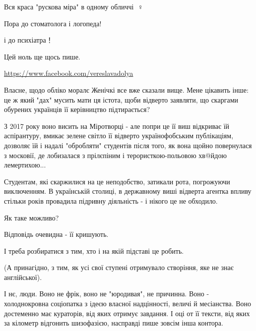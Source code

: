 \begin{itemize}
Вся краса "рускова міра" в одному обличчі 🤦♀️


Пора до стоматолога і логопеда!

\begin{itemize}

і до психіатра！
\end{itemize}


Цей ноль ще щось пише.

\url{https://www.facebook.com/vereslavadolya}\par

Власне, щодо обліко моралє Женічкі все вже сказали вище. Мене цікавить інше: це
ж який "дах" мусить мати ця істота, щоби відверто заявляти, що скаргами
обурених українців її керівництво підтирається? 

З 2017 року воно висить на Міротворці - але попри це її виш відкриває їй
аспірантуру, вмикає зелене світло її відверто українофобським публікаціям,
дозволяє їй і надалі "обробляти" студентів після того, як вона щойно
повернулася з московії, де лобизалася з прілєпіним і терористкою-польовою
хв@йдою лемертихою... 

Студентам, які скаржилися на це неподобство, затикали рота, погрожуючи
виключенням. В українській столиці, в державному виші відверта агентка впливу
стільки років провадила підривну діяльність - і нікого це не обходило.

Як таке можливо?

Відповідь очевидна - її кришують.

І треба розбиратися з тим, хто і на якій підставі це робить.

(А принагідно, з тим, як усі свої ступені отримувало створіння, яке не знає англійської).

І нє, люди. Воно не фрік, воно не "юродивая", не причинна. Воно - холоднокровна
соціопатка з ідеєю власної надцінності, величі й месіанства. Воно достеменно
має кураторів, від яких отримує завдання. І оці от її тексти, від яких за
кілометр відгонить шизофазією, насправді пише зовсім інша контора.


\end{itemize}

